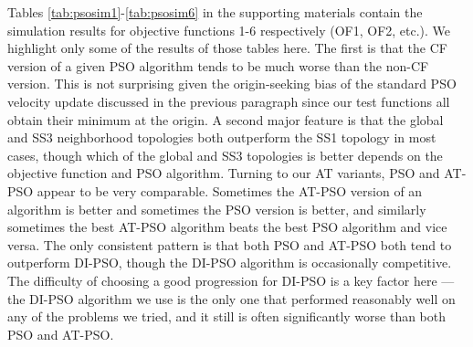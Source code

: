 \documentclass[cmbright]{staauth}
\begin{document}
Tables \ref{tab:psosim1}-\ref{tab:psosim6} in the supporting materials contain the simulation results for objective functions 1-6 respectively (OF1, OF2, etc.). We highlight only some of the results of those tables here. The first is that the CF version of a given PSO algorithm tends to be much worse than the non-CF version. This is not surprising given the origin-seeking bias of the standard PSO velocity update discussed in the previous paragraph since our test functions all obtain their minimum at the origin. A second major feature is that the global and SS3 neighborhood topologies both outperform the SS1 topology in most cases, though which of the global and SS3 topologies is better depends on the objective function and PSO algorithm. Turning to our AT variants, PSO and AT-PSO appear to be very comparable. Sometimes the AT-PSO version of an algorithm is better and sometimes the PSO version is better, and similarly sometimes the best AT-PSO algorithm beats the best PSO algorithm and vice versa. The only consistent pattern is that both PSO and AT-PSO both tend to outperform DI-PSO, though the DI-PSO algorithm is occasionally competitive. The difficulty of choosing a good progression for DI-PSO is a key factor here --- the DI-PSO algorithm we use is the only one that performed reasonably well on any of the problems we tried, and it still is often significantly worse than both PSO and AT-PSO.
\end{document}
